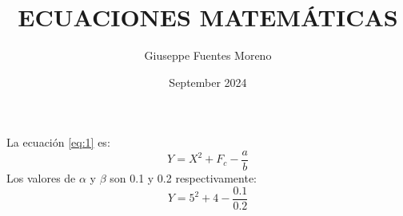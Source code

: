 \documentclass{article}
\title{ECUACIONES MATEMÁTICAS}
\author{Giuseppe Fuentes Moreno}
\date{September 2024}
\begin{document}
\maketitle


La ecuación \ref{eq:1} es:
\begin{equation}\label{eq:1}
    Y=X^2+F_c-\frac{a}{b}
\end{equation}
Los valores de  $\alpha$ y $\beta$ son 0.1 y 0.2 respectivamente:
\[Y=5^2+4-\frac{0.1}{0.2}\]

\end{document}
